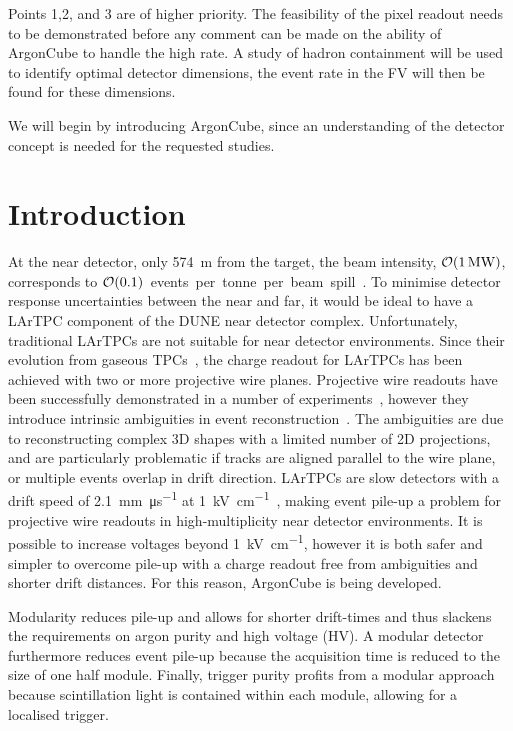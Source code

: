 \documentclass[a4paper]{article}
\begin{document}
Points 1,2, and 3 are of higher priority.
The feasibility of the pixel readout needs to be demonstrated before any comment can be made on the ability of ArgonCube to handle the high rate.
A study of hadron containment will be used to identify optimal detector dimensions, the event rate in the FV will then be found for these dimensions. 

We will begin by introducing ArgonCube, since an understanding of the detector concept is needed for the requested studies.
	
\section{Introduction} \label{sec:Intro}

At the near detector, only \SI{574}{\metre} from the target, the beam intensity, $\order{\SI{1}{\mega\watt}}$, corresponds to $\order{0.1}$~events~per~tonne~per~beam~spill~\cite{DUNE2,DUNE3}.
To minimise detector response uncertainties between the near and far, it would be ideal to have a LArTPC component of the DUNE near detector complex.
Unfortunately, traditional LArTPCs are not suitable for near detector environments.
Since their evolution from gaseous TPCs~\cite{TPC,LArIonize,LArTPC}, the charge readout for LArTPCs has been achieved with two or more projective wire planes. 
Projective wire readouts have been successfully demonstrated in a number of experiments~\cite{icarus,argonute,uboner}, however they introduce intrinsic ambiguities in event reconstruction~\cite{ambiguous}. 
The ambiguities are due to reconstructing complex 3D shapes with a limited number of 2D projections, and are particularly problematic if tracks are aligned parallel to the wire plane, or multiple events overlap in drift direction.    
LArTPCs are slow detectors with a drift speed of \SI{2.1}{\milli\metre\per\micro\second} at \SI{1}{\kilo\volt\per\centi\metre}~\cite{protoLASER}, making event pile-up a problem for projective wire readouts in high-multiplicity near detector environments.
It is possible to increase voltages beyond \SI{1}{\kilo\volt\per\centi\metre}\cite{breakdown_16, latex}, however it is both safer and simpler to overcome pile-up with a charge readout free from ambiguities and shorter drift distances. 
For this reason, ArgonCube is being developed. 

Modularity reduces pile-up and allows for shorter drift-times and thus slackens the requirements on argon purity and high voltage (HV).
A modular detector furthermore reduces event pile-up because the acquisition time is reduced to the size of one half module.
Finally, trigger purity profits from a modular approach because scintillation light is contained within each module, allowing for a localised trigger.
\end{document}
